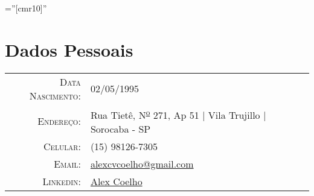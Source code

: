 \documentclass[a4paper,10pt]{article}
\begin{document}
\pagestyle{empty} %

\font\fb=''[cmr10]'' %

\par{\bigskip\par}

\section{Dados Pessoais}

\begin{tabular}{rl}
    \textsc{Data Nascimento:} & 02/05/1995 \\
    \textsc{Endereço:}   & Rua Tietê, N\textsuperscript{\underline{o}} 271, Ap 51 | Vila Trujillo | Sorocaba - SP \\
    \textsc{Celular:}     & (15) 98126-7305\\
    \textsc{Email:}     & \href{mailto:alexcvcoelho@gmail.com}{alexcvcoelho@gmail.com} \\
    \textsc{Linkedin:} & \href{https://www.linkedin.com/in/alex-coelho-475654a3/}{Alex Coelho}
\end{tabular}

\end{document}
